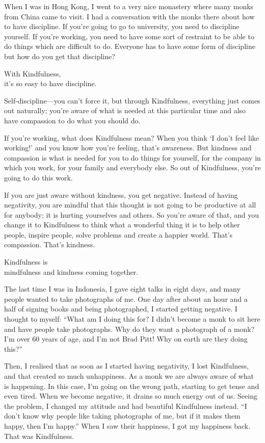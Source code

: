 \documentclass[12pt, openany]{book}
\newenvironment{aphorism}%
{%
\begin{center}\begin{itshape}
}%
{\end{itshape}\end{center}
}%
\begin{document}
When I was in Hong Kong, I went to a very nice monastery where many monks from China came to visit. I had a conversation with the monks there about how to have discipline. If you’re going to go to university, you need to discipline yourself. If you’re working, you need to have some sort of restraint to be able to do things which are difficult to do. Everyone has to have some form of discipline but how do you get that discipline? 

\begin{aphorism}
With Kindfulness,\\  
it’s so easy to have discipline.
\end{aphorism}

Self-discipline—you can’t force it, but through Kindfulness, everything just comes out naturally; you’re aware of what is needed at this particular time and also have compassion to do what you should do. 

If you’re working, what does Kindfulness mean? When you think ‘I don’t feel like working!’ and you know how you’re feeling, that’s awareness. But kindness and compassion is what is needed for you to do things for yourself, for the company in which you work, for your family and everybody else. So out of Kindfulness, you’re going to do this work. 

If you are just aware without kindness, you get negative. Instead of having negativity, you are mindful that this thought is not going to be productive at all for anybody; it is hurting yourselves and others. So you’re aware of that, and you change it to Kindfulness to think what a wonderful thing it is to help other people, inspire people, solve problems and create a happier world. That’s compassion. That’s kindness. 

\begin{aphorism}
Kindfulness is\\  
mindfulness and kindness coming together.
\end{aphorism}

The last time I was in Indonesia, I gave eight talks in eight days, and many people wanted to take photographs of me. One day after about an hour and a half of signing books and being photographed, I started getting negative. I thought to myself: “What am I doing this for? I didn’t become a monk to sit here and have people take photographs. Why do they want a photograph of a monk? I’m over 60 years of age, and I’m not Brad Pitt! Why on earth are they doing this?” 

Then, I realised that as soon as I started having negativity, I lost Kindfulness, and that created so much unhappiness. As a monk we are always aware of what is happening. In this case, I’m going on the wrong path, starting to get tense and even tired. When we become negative, it drains so much energy out of us. Seeing the problem, I changed my attitude and had beautiful Kindfulness instead. “I don’t know why people like taking photographs of me, but if it makes them happy, then I’m happy.” When I saw their happiness, I got my happiness back. That was Kindfulness. 🤩
\end{document}
